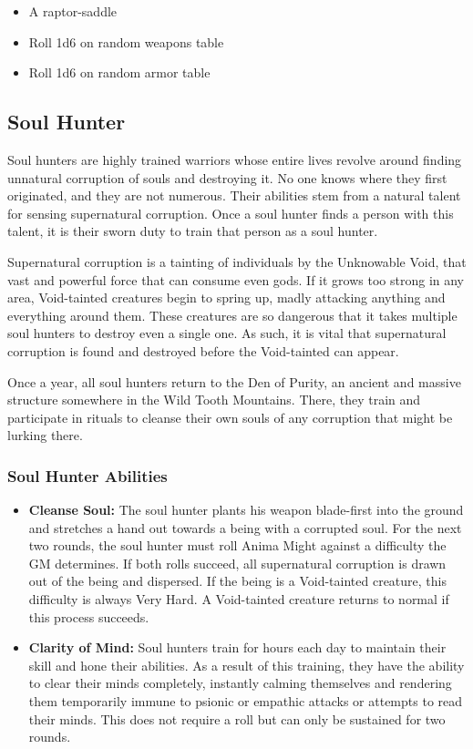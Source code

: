 \begin{multicols}{2}
\begin{itemize}
  \item A raptor-saddle
  \item Roll 1d6 on random weapons table
  \item Roll 1d6 on random armor table
\end{itemize}

\subsection{Soul Hunter}

Soul hunters are highly trained warriors whose entire lives revolve around
finding unnatural corruption of souls and destroying it. No one knows where
they first originated, and they are not numerous. Their abilities stem from
a natural talent for sensing supernatural corruption. Once a soul hunter 
finds a person with this talent, it is their sworn duty to train that person
as a soul hunter.

Supernatural corruption is a tainting of individuals by the Unknowable Void, 
that vast and powerful force that can consume even gods. If it grows too strong
in any area, Void-tainted creatures begin to spring up, madly attacking anything
and everything around them. These creatures are so dangerous that it takes
multiple soul hunters to destroy even a single one. As such, it is vital that
supernatural corruption is found and destroyed before the Void-tainted can appear.

Once a year, all soul hunters return to the Den of Purity, an ancient and massive
structure somewhere in the Wild Tooth Mountains. There, they train and
participate in rituals to cleanse their own souls of any corruption that might
be lurking there.

\subsubsection{Soul Hunter Abilities}

\begin{itemize}
  \item \textbf{Cleanse Soul:} The soul hunter plants his weapon blade-first into
    the ground and stretches a hand out towards a being with a corrupted soul. For
    the next two rounds, the soul hunter must roll Anima Might against a difficulty
    the GM determines. If both rolls succeed, all supernatural corruption is drawn
    out of the being and dispersed. If the being is a Void-tainted creature, this
    difficulty is always Very Hard. A Void-tainted creature returns to normal if
    this process succeeds.
  \item \textbf{Clarity of Mind:} Soul hunters train for hours each day to maintain
    their skill and hone their abilities. As a result of this training, they have
    the ability to clear their minds completely, instantly calming themselves and rendering
    them temporarily immune to psionic or empathic attacks or attempts to read
    their minds. This does not require a roll but can only be sustained for two rounds.
\end{itemize}


\end{multicols}

